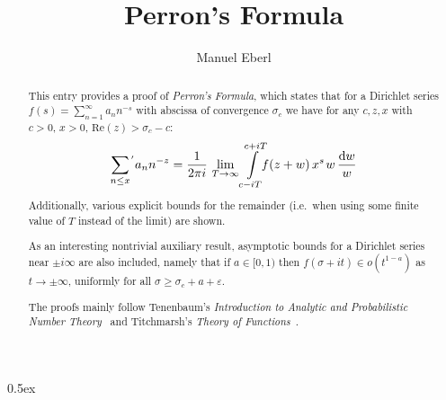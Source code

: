 \documentclass[11pt,a4paper]{article}
\begin{document}
\title{Perron's Formula}
\author{Manuel Eberl}
\maketitle

\begin{abstract}
This entry provides a proof of \emph{Perron's Formula}, which states that
for a Dirichlet series $f(s) = \sum_{n=1}^\infty a_n n^{-s}$ with abscissa of convergence $\sigma_c$
we have for any $c, z, x$ with $c > 0$, $x > 0$, $\text{Re}(z) > \sigma_c - c$:
  \[\sum\limits_{n\leq x}\kern-1pt^{'} a_n n^{-z} =
      \frac{1}{2\pi i}\, \lim_{T\to\infty} \int\limits_{c-iT}^{c+iT}\hskip-4pt f(z + w)\, 
         x^s\kern1pt w\,\frac{\text{d}w}{w} \]
Additionally, various explicit bounds for the remainder (i.e.\ when using some finite value of $T$ 
instead of the limit) are shown.

As an interesting nontrivial auxiliary result, asymptotic bounds for a Dirichlet series near
$\pm i\infty$ are also included, namely that if $a\in[0,1)$ then $f(\sigma + it) \in o(t^{1-a})$ as
$t\to\pm\infty$, uniformly for all $\sigma\geq \sigma_c + a + \varepsilon$.

The proofs mainly follow Tenenbaum's \emph{Introduction to Analytic and Probabilistic Number
Theory}~\cite{tenenbaum} and Titchmarsh's \emph{Theory of Functions}~\cite{titchmarsh}.
\end{abstract}

\newpage
\tableofcontents

\newpage
\parindent 0pt\parskip 0.5ex



\nocite{titchmarsh, tenenbaum}
\raggedright


\end{document}
